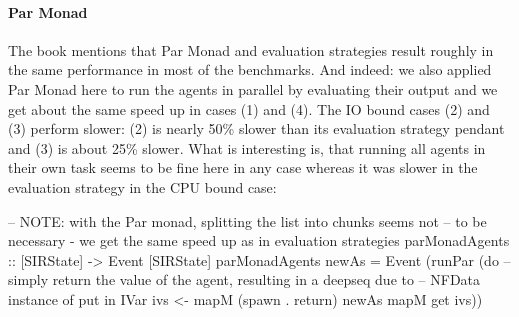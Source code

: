 \paragraph{Par Monad} The book \cite{marlow_parallel_2013} mentions that Par Monad and evaluation strategies result roughly in the same performance in most of the benchmarks. And indeed: we also applied Par Monad here to run the agents in parallel by evaluating their output and we get about the same speed up in cases (1) and (4). The IO bound cases (2) and (3) perform slower: (2) is nearly 50\% slower than its evaluation strategy pendant and (3) is about 25\% slower. What is interesting is, that running all agents in their own task seems to be fine here in any case whereas it was slower in the evaluation strategy in the CPU bound case:

\begin{HaskellCode}
-- NOTE: with the Par monad, splitting the list into chunks seems not 
-- to be necessary - we get the same speed up as in evaluation strategies
parMonadAgents :: [SIRState] -> Event [SIRState]
parMonadAgents newAs = Event (runPar (do
  -- simply return the value of the agent, resulting in a deepseq due to
  -- NFData instance of put in IVar
  ivs <- mapM (spawn . return) newAs
  mapM get ivs))
\end{HaskellCode}

